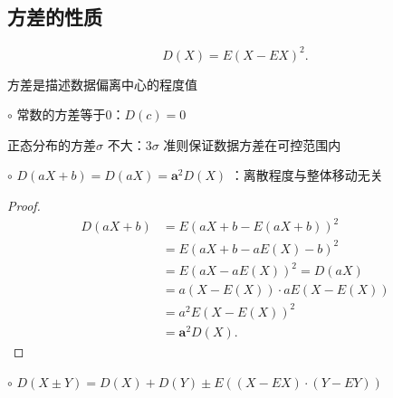 \subsection{方差的性质}%
\label{sub:方差的性质}
\[
    D\left( X \right) =E\left( X-EX \right) ^2
.\] 
\begin{notation}
    方差是描述数据偏离中心的程度值
\end{notation}
$\circ$ 常数的方差等于0：$D\left( c \right) =0$
\begin{notation}
    正态分布的方差$\sigma$ 不大：$3\sigma$ 准则保证数据方差在可控范围内
\end{notation}
$\circ$ $D\left( aX+b \right) =D\left( aX \right)=\bm{a}^2 D\left( X \right)  $ ：离散程度与整体移动无关
\begin{proof}
    \begin{align*}
        D\left( aX+b \right) &= E\left( aX+b-E\left( aX+b \right)  \right) ^2 \\
        &= E\left( aX+b-aE\left( X \right) -b \right) ^2 \\
        &= E\left( aX-aE\left( X \right)  \right) ^2 =D\left( aX \right) \\
        &= a\left( X-E\left( X \right)  \right) \cdot aE\left( X-E\left( X \right)  \right)  \\
        &= a^2E\left( X-E(X) \right)^2 \\
        &= \bm{a}^2 D\left( X \right) 
    .\end{align*}
\end{proof}
$\circ$ $D\left( X\pm Y \right) =D\left( X \right) +D\left( Y \right) \pm E\left( \left( X-EX \right) \cdot \left( Y-EY \right)  \right) $

